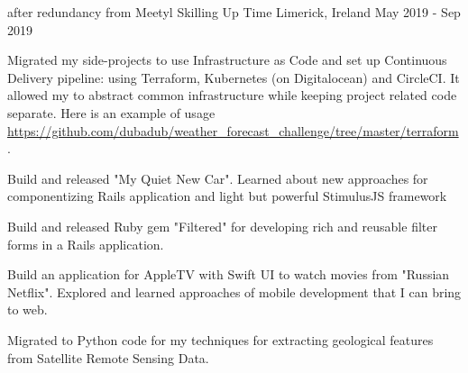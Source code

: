 


\begin{cventries}

  \cventry
    {after redundancy from Meetyl} %
    {Skilling Up Time} %
    {Limerick, Ireland} %
    {May 2019 - Sep 2019} %
    {
      \begin{cvitems} %
        \item {Migrated my side-projects to use Infrastructure as Code and set up Continuous Delivery pipeline: using Terraform, Kubernetes (on Digitalocean) and CircleCI. It allowed my to abstract common infrastructure while keeping project related code separate. Here is an example of usage \url{https://github.com/dubadub/weather_forecast_challenge/tree/master/terraform}.}
        \item {Build and released "My Quiet New Car". Learned about new approaches for componentizing Rails application and light but powerful StimulusJS framework}
        \item {Build and released Ruby gem "Filtered" for developing rich and reusable filter forms in a Rails application.}
        \item {Build an application for AppleTV with Swift UI to watch movies from "Russian Netflix". Explored and learned approaches of mobile development that I can bring to web.}
        \item {Migrated to Python code for my techniques for extracting geological features from Satellite Remote Sensing Data.}
      \end{cvitems}
    }

\end{cventries}

